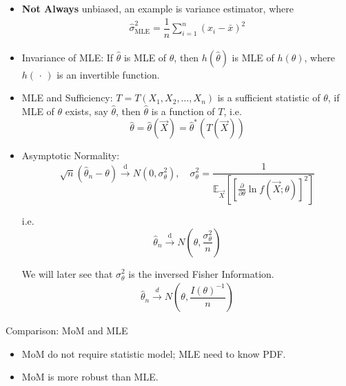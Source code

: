        
    \begin{itemize}
        \item \textbf{Not Always} unbiased, an example is variance estimator, where
        \begin{align}
            \hat{\sigma }^2_\mathrm{MLE}=\dfrac{1}{n}\sum_{i=1}^n(x_i-\bar{x})^2  
        \end{align}
        
         
        \item Invariance of MLE: If $\hat{\theta}$ is MLE of $\theta$,  then $h(\hat{\theta})$ is MLE of $h(\theta)$, where $ h(\, \cdot \, ) $ is an invertible function.
        \item MLE and Sufficiency: $T=T(X_1,X_2,\ldots,X_n)$ is a sufficient statistic of $\theta$, if MLE of $\theta$ exists, say $\hat{\theta}$, then $\hat{\theta}$ is a function of $T$, i.e.
        \begin{equation}  
            \hat{\theta}=\hat{\theta}(\vec{X})=\hat{\theta}^*(T(\vec{X}))    
        \end{equation}
        \item Asymptotic Normality: 
        \begin{equation}
            \sqrt{n}(\hat{\theta}_n-\theta) \xrightarrow[]{\mathrm{d}}N(0,\sigma^2_\theta),\quad \sigma^2_\theta=\frac{1}{\mathbb{E}_{\vec{X}}\left[[\frac{\partial}{\partial\theta}\ln f(\vec{X};\theta)]^2\right]}   
        \end{equation}

        i.e.
        \begin{equation}
            \hat{\theta}_n\xrightarrow[]{\mathrm{d}}N(\theta,\frac{\sigma^2_\theta}{n})    
        \end{equation}
        
        We will later see that $ \sigma _\theta ^2 $ is the inversed Fisher Information.
        \begin{align}\label{EqaAsymptoticDistributionMLE}
            \hat{\theta }_n\xrightarrow[]{d} N(\theta ,\dfrac{I(\theta )^{-1}}{n})
        \end{align}
        
        
    \end{itemize}

    \begin{point}
        Comparison: MoM and MLE
    \end{point}
    
        
    \begin{itemize}
        \item MoM do not require statistic model; MLE need to know PDF.
        \item MoM is more robust than MLE.
    \end{itemize}


